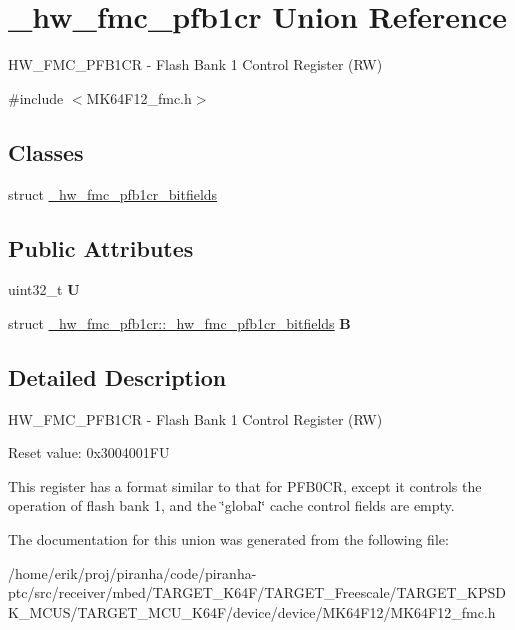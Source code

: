 \hypertarget{union__hw__fmc__pfb1cr}{}\section{\+\_\+hw\+\_\+fmc\+\_\+pfb1cr Union Reference}
\label{union__hw__fmc__pfb1cr}


H\+W\+\_\+\+F\+M\+C\+\_\+\+P\+F\+B1\+CR -\/ Flash Bank 1 Control Register (RW)  




{\ttfamily \#include $<$M\+K64\+F12\+\_\+fmc.\+h$>$}

\subsection*{Classes}
\begin{DoxyCompactItemize}
\item 
struct \hyperlink{struct__hw__fmc__pfb1cr_1_1__hw__fmc__pfb1cr__bitfields}{\+\_\+hw\+\_\+fmc\+\_\+pfb1cr\+\_\+bitfields}
\end{DoxyCompactItemize}
\subsection*{Public Attributes}
\begin{DoxyCompactItemize}
\item 
uint32\+\_\+t {\bfseries U}\hypertarget{union__hw__fmc__pfb1cr_aa31f74f99932d137db993b24b5b708de}{}\label{union__hw__fmc__pfb1cr_aa31f74f99932d137db993b24b5b708de}

\item 
struct \hyperlink{struct__hw__fmc__pfb1cr_1_1__hw__fmc__pfb1cr__bitfields}{\+\_\+hw\+\_\+fmc\+\_\+pfb1cr\+::\+\_\+hw\+\_\+fmc\+\_\+pfb1cr\+\_\+bitfields} {\bfseries B}\hypertarget{union__hw__fmc__pfb1cr_a06be482f754ec20e1c48be3a68d73dfa}{}\label{union__hw__fmc__pfb1cr_a06be482f754ec20e1c48be3a68d73dfa}

\end{DoxyCompactItemize}


\subsection{Detailed Description}
H\+W\+\_\+\+F\+M\+C\+\_\+\+P\+F\+B1\+CR -\/ Flash Bank 1 Control Register (RW) 

Reset value\+: 0x3004001\+FU

This register has a format similar to that for P\+F\+B0\+CR, except it controls the operation of flash bank 1, and the \char`\"{}global\char`\"{} cache control fields are empty. 

The documentation for this union was generated from the following file\+:\begin{DoxyCompactItemize}
\item 
/home/erik/proj/piranha/code/piranha-\/ptc/src/receiver/mbed/\+T\+A\+R\+G\+E\+T\+\_\+\+K64\+F/\+T\+A\+R\+G\+E\+T\+\_\+\+Freescale/\+T\+A\+R\+G\+E\+T\+\_\+\+K\+P\+S\+D\+K\+\_\+\+M\+C\+U\+S/\+T\+A\+R\+G\+E\+T\+\_\+\+M\+C\+U\+\_\+\+K64\+F/device/device/\+M\+K64\+F12/M\+K64\+F12\+\_\+fmc.\+h\end{DoxyCompactItemize}
